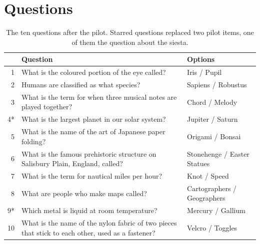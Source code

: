 \documentclass[11pt,a4paper]{article}
\begin{document}
\section{Questions}\label{app:items}
\begin{table}[h]
\centering\small
\begin{tabular}{@{}r>{\raggedright\arraybackslash}p{9.2cm}l@{}}
\toprule
& Question & Options \\
\midrule
1 & What is the coloured portion of the eye called? & Iris / Pupil \\
2 & Humans are classified as what species? & Sapiens / Robustus \\
3 & What is the term for when three musical notes are played together? & Chord / Melody \\
4* & What is the largest planet in our solar system? & Jupiter / Saturn \\
5 & What is the name of the art of Japanese paper folding? & Origami / Bonsai \\
6 & What is the famous prehistoric structure on Salisbury Plain, England, called? & Stonehenge / Easter Statues \\
7 & What is the term for nautical miles per hour? & Knot / Speed \\
8 & What are people who make maps called? & Cartographers / Geographers \\
9* & Which metal is liquid at room temperature? & Mercury / Gallium \\
10 & What is the name of the nylon fabric of two pieces that stick to each other, used as a fastener? & Velcro / Toggles \\
\bottomrule
\end{tabular}
\caption{The ten questions after the pilot. Starred questions replaced two pilot items, one of them the question about the siesta.}
\end{table}
\end{document}
